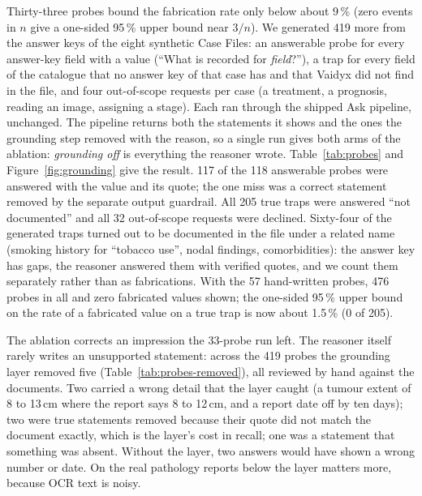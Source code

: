 \documentclass{article}
\newcommand{\fit}[1]{\adjustbox{max width=\textwidth}{#1}}
\newcommand{\pct}{\,\%}
\begin{document}
Thirty-three probes bound the fabrication rate only below about 9\pct{} (zero events in $n$ give a one-sided 95\pct{} upper bound near $3/n$). We generated 419 more from the answer keys of the eight synthetic Case Files: an answerable probe for every answer-key field with a value (``What is recorded for \emph{field}?''), a trap for every field of the catalogue that no answer key of that case has and that Vaidyx did not find in the file, and four out-of-scope requests per case (a treatment, a prognosis, reading an image, assigning a stage). Each ran through the shipped Ask pipeline, unchanged. The pipeline returns both the statements it shows and the ones the grounding step removed with the reason, so a single run gives both arms of the ablation: \emph{grounding off} is everything the reasoner wrote. Table~\ref{tab:probes} and Figure~\ref{fig:grounding} give the result. 117 of the 118 answerable probes were answered with the value and its quote; the one miss was a correct statement removed by the separate output guardrail. All 205 true traps were answered ``not documented'' and all 32 out-of-scope requests were declined. Sixty-four of the generated traps turned out to be documented in the file under a related name (smoking history for ``tobacco use'', nodal findings, comorbidities): the answer key has gaps, the reasoner answered them with verified quotes, and we count them separately rather than as fabrications. With the 57 hand-written probes, 476 probes in all and zero fabricated values shown; the one-sided 95\pct{} upper bound on the rate of a fabricated value on a true trap is now about 1.5\pct{} (0 of 205).

The ablation corrects an impression the 33-probe run left. The reasoner itself rarely writes an unsupported statement: across the 419 probes the grounding layer removed five (Table~\ref{tab:probes-removed}), all reviewed by hand against the documents. Two carried a wrong detail that the layer caught (a tumour extent of 8 to 13\,cm where the report says 8 to 12\,cm, and a report date off by ten days); two were true statements removed because their quote did not match the document exactly, which is the layer's cost in recall; one was a statement that something was absent. Without the layer, two answers would have shown a wrong number or date. On the real pathology reports below the layer matters more, because OCR text is noisy.

\begin{table}[htbp]
\centering\small
\caption{The larger probe set through the shipped Ask pipeline (Gemma-4-31B-it, non-medical, with the verbatim-quote check).}
\label{tab:probes}
\fit{}
\end{table}
\end{document}
